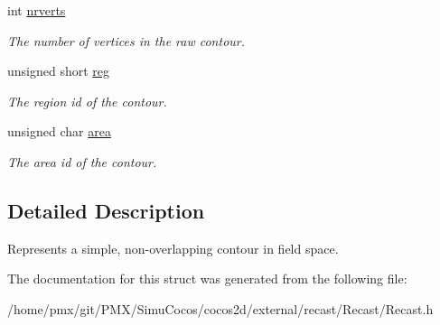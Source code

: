 \begin{DoxyCompactItemize}
int \hyperlink{structrcContour_a0cceba5f2070c42ac2a871189d4ceb53}{nrverts}
\begin{DoxyCompactList}\small\item\em The number of vertices in the raw contour. \end{DoxyCompactList}\item 
\mbox{\label{structrcContour_a8971d5c5cc7c7fb8e5d79a6ff9812cd1}} 
unsigned short \hyperlink{structrcContour_a8971d5c5cc7c7fb8e5d79a6ff9812cd1}{reg}
\begin{DoxyCompactList}\small\item\em The region id of the contour. \end{DoxyCompactList}\item 
\mbox{\label{structrcContour_a1052e9ac2da6e515cbb12908a58fca78}} 
unsigned char \hyperlink{structrcContour_a1052e9ac2da6e515cbb12908a58fca78}{area}
\begin{DoxyCompactList}\small\item\em The area id of the contour. \end{DoxyCompactList}\end{DoxyCompactItemize}


\subsection{Detailed Description}
Represents a simple, non-\/overlapping contour in field space. 

The documentation for this struct was generated from the following file\+:\begin{DoxyCompactItemize}
\item 
/home/pmx/git/\+P\+M\+X/\+Simu\+Cocos/cocos2d/external/recast/\+Recast/Recast.\+h\end{DoxyCompactItemize}
